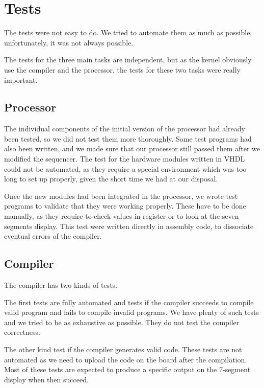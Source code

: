 \documentclass[openany, a4paper]{book}
\begin{document}
    \section{Tests}
      The tests were not easy to do. We tried to automate them as much as
      possible, unfortunately, it was not always possible.

      The tests for the three main tasks are independent, but as the kernel
      obviously use the compiler and the processor, the tests for these two
      tasks were really important.

      \subsection{Processor}
        
        The individual components of the initial version of the processor had
        already been tested, so we did not test them more thoroughly. Some test
        programs had also been written, and we made sure that our processor
        still passed them after we modified the sequencer.
        The test for the hardware modules written in VHDL could not be
        automated, as they require a special environment which was too long to
        set up properly, given the short time we had at our disposal. 
        
        Once the new modules had been integrated in the processor, we wrote
        test programs to validate that they were working properly. These have
        to be done manually, as they require to check values in register or to
        look at the seven segments display. This test were written directly in
        assembly code, to dissociate eventual errors of the compiler.

      \subsection{Compiler}
        The compiler has two kinds of tests.

        The first tests are fully automated and tests if the compiler succeeds
        to compile valid program and fails to compile invalid programs. We have
        plenty of such tests and we tried to be as exhaustive as possible. They
        do not test the compiler correctness.

        The other kind test if the compiler generates valid code. These tests
        are not automated as we need to upload the code on the board after the
        compilation. Most of these tests are expected to produce a specific
        output on the 7-segment display when then succeed.
\end{document}

